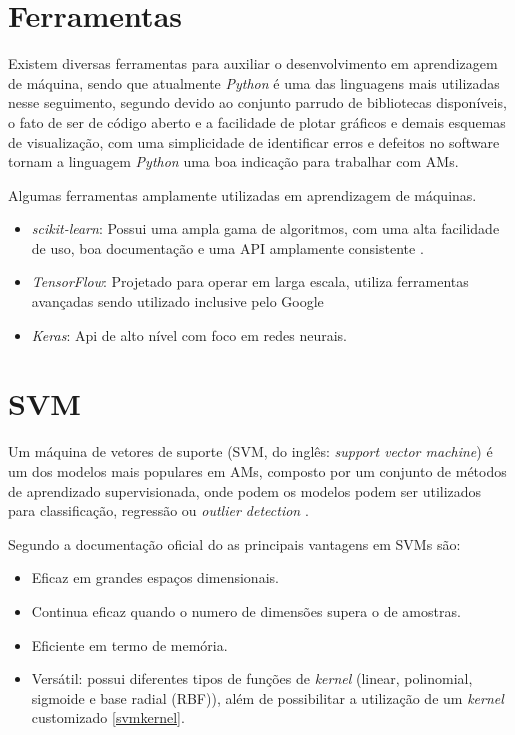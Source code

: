 \section{Ferramentas}
Existem diversas ferramentas para auxiliar o desenvolvimento em aprendizagem de máquina, sendo que atualmente \textit{Python} é uma das linguagens mais utilizadas nesse seguimento, segundo  devido ao conjunto parrudo de bibliotecas disponíveis, o fato de ser de código aberto e a facilidade de plotar gráficos e demais esquemas de visualização, com uma simplicidade de identificar erros e defeitos no software tornam a linguagem \textit{Python} uma boa indicação para trabalhar com AMs.

Algumas ferramentas amplamente utilizadas em aprendizagem de máquinas.
\begin{itemize}
    \item \textit{scikit-learn}: Possui uma ampla gama de algoritmos, com uma alta facilidade de uso, boa documentação e uma API amplamente consistente \cite{scikit-learn}. 
    \item \textit{TensorFlow}: Projetado para operar em larga escala, utiliza ferramentas avançadas sendo utilizado inclusive pelo Google\cite{abadi2016tensorflow}
    \item \textit{Keras}: Api de alto nível com foco em redes neurais.
\end{itemize}

\section{SVM}

Um máquina de vetores de suporte (SVM, do inglês: \textit{support vector machine}) é um dos modelos mais populares em AMs, composto por um conjunto de métodos de aprendizado supervisionada, onde podem os modelos podem ser utilizados para classificação, regressão ou \textit{outlier detection} \cite{scikit-learn}.

Segundo a documentação oficial do  as principais vantagens em SVMs são:

\begin{itemize}
    \item Eficaz em grandes espaços dimensionais.
    \item Continua eficaz quando o numero de dimensões supera o de amostras.
    \item Eficiente em termo de memória.
    \item Versátil: possui diferentes tipos de funções de \textit{kernel} (linear, polinomial, sigmoide e base radial (RBF)), além de possibilitar a utilização de um \textit{kernel} customizado \ref{svmkernel}.
\end{itemize}

